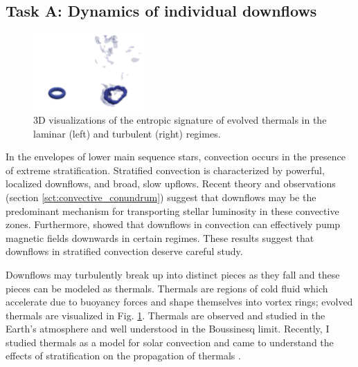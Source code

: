 \documentclass[aasms,11pt, longbibliography]{article}
\begin{document}
\subsection{Task A: Dynamics of individual downflows}
\label{sct:taskA}
\begin{figure}
	\begin{center}
	\vspace{-10pt}
    \includegraphics[width=0.38\textwidth]{./figs/thermals_comparison.png}
	\vspace{-15pt}
	\end{center}
    \caption{
	3D visualizations of the entropic signature of evolved thermals in the laminar (left) and turbulent (right) regimes.
	\label{fig:thermals_comparison} }
\end{figure}

In the envelopes of lower main sequence stars, convection occurs in the presence of extreme stratification.
Stratified convection is characterized by powerful, localized downflows, and broad, slow upflows.
Recent theory and observations (section \ref{sct:convective_conundrum}) suggest that downflows may be the predominant mechanism for transporting stellar luminosity in these convective zones.
Furthermore, \citet{tobias&all1998} showed that downflows in convection can effectively pump magnetic fields downwards in certain regimes.
These results suggest that downflows in stratified convection deserve careful study.

Downflows may turbulently break up into distinct pieces as they fall and these pieces can be modeled as thermals.
Thermals are regions of cold fluid which accelerate due to buoyancy forces and shape themselves into vortex rings; evolved thermals are visualized in Fig. \ref{fig:thermals_comparison}.
Thermals are observed and studied in the Earth's atmosphere and well understood in the Boussinesq limit.
Recently, I studied thermals as a model for solar convection and came to understand the effects of stratification on the propagation of thermals \citep{andersLB2019}.
\end{document}
